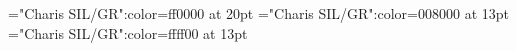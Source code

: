 \documentclass[a4paper]{article}
\begin{document}
\pagestyle{plain}
\sloppy
\setlength{\parfillskip}{0pt plus 1fil}
\font\ta="Charis SIL/GR":color=ff0000 at 20pt
\font\tcta="Charis SIL/GR":color=008000 at 13pt
\font\tdtcta="Charis SIL/GR":color=ffff00 at 13pt

\mbox{} 
\newpage 
\newpage 
\setcounter{page}{1} 
\pagestyle{fancy} 




\end{document}
